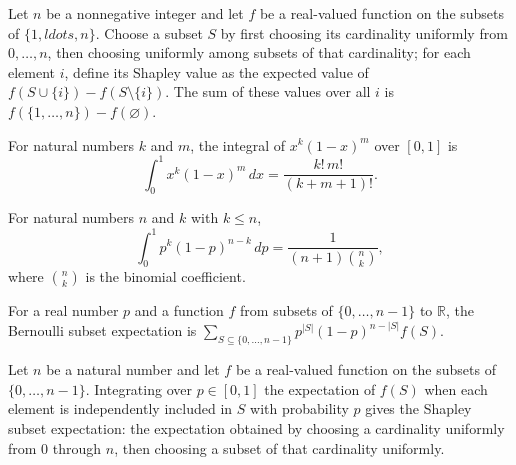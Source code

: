 \begin{theorem}
\label{FABL.sum_shapleyValue}
\leanok
{}
Let $n$ be a nonnegative integer and let $f$ be a real-valued function on the subsets of
$\{1,ldots,n\}$. Choose a subset $S$ by first choosing its cardinality uniformly from
$0,\ldots,n$, then choosing uniformly among subsets of that cardinality; for each
element $i$, define its Shapley value as the expected value of
$f(S\cup\{i\})-f(S\setminus\{i\})$. The sum of these values over all $i$ is
$f(\{1,\ldots,n\})-f(\varnothing)$.
\end{theorem}

\begin{theorem}
\label{FABL.integral_pow_mul_one_sub_pow}
\leanok
{}
For natural numbers $k$ and $m$, the integral of $x^k(1-x)^m$ over $[0,1]$ is
\[\int_0^1 x^k(1-x)^m\,dx=\frac{k!\,m!}{(k+m+1)!}.\]
\end{theorem}

\begin{theorem}
\label{FABL.integral_bernoulliSubsetMass_eq_shapleyLayerWeight}
\leanok
{}
For natural numbers $n$ and $k$ with $k\le n$, \[\int_0^1
p^k(1-p)^{n-k}\,dp=\frac{1}{(n+1)\binom{n}{k}},\] where $\binom{n}{k}$ is the binomial
coefficient.
\end{theorem}

\begin{definition}
\label{FABL.bernoulliSubsetExpectation}
\leanok
For a real number $p$ and a function $f$ from subsets of $\{0,\ldots,n-1\}$ to $\mathbb
R$, the Bernoulli subset expectation is
$\sum_{S\subseteq\{0,\ldots,n-1\}}p^{|S|}(1-p)^{n-|S|}f(S)$.
\end{definition}

\begin{theorem}
\label{FABL.integral_bernoulliSubsetExpectation_eq_shapleyExpectation}
\leanok
{}
Let $n$ be a natural number and let $f$ be a real-valued function on the subsets of
$\{0,\ldots,n-1\}$. Integrating over $p\in[0,1]$ the expectation of $f(S)$ when each
element is independently included in $S$ with probability $p$ gives the Shapley subset
expectation: the expectation obtained by choosing a cardinality uniformly from $0$
through $n$, then choosing a subset of that cardinality uniformly.
\end{theorem}

